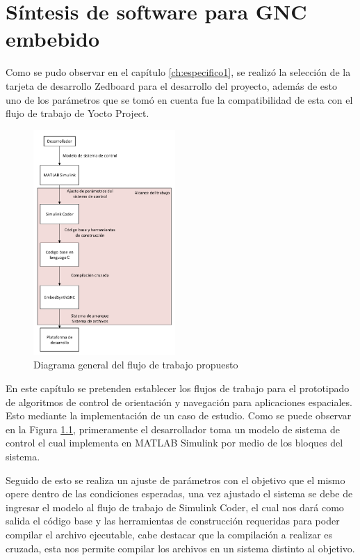 \chapter{Síntesis de software para GNC embebido}
\label{ch:especifico2}

Como se pudo observar en el capítulo \ref{ch:especifico1}, se realizó la selección de la tarjeta de desarrollo Zedboard para el desarrollo del proyecto, además de esto uno de los parámetros que se tomó en cuenta fue la compatibilidad de esta con el flujo de trabajo de Yocto Project.

\begin{figure}[h!]
    \centering
    \includegraphics[width=0.48\textwidth]{fig/especifico_2/Diagrama general del proyecto.pdf}
    \caption{Diagrama general del flujo de trabajo propuesto}
    \label{fig:diagrama_flujo_trabajo}
\end{figure}

En este capítulo se pretenden establecer los flujos de trabajo para el prototipado de algoritmos de control de orientación y navegación para aplicaciones espaciales. Esto mediante la implementación de un caso de estudio. Como se puede observar en la Figura \ref{fig:diagrama_flujo_trabajo}, primeramente el desarrollador toma un modelo de sistema de control el cual implementa en MATLAB Simulink por medio de los bloques del sistema. 

Seguido de esto se realiza un ajuste de parámetros con el objetivo que el mismo opere dentro de las condiciones esperadas, una vez ajustado el sistema se debe de ingresar el modelo al flujo de trabajo de Simulink Coder, el cual nos dará como salida el código base y las herramientas de construcción requeridas para poder compilar el archivo ejecutable, cabe destacar que la compilación a realizar es cruzada, esta nos permite compilar los archivos en un sistema distinto al objetivo. 


